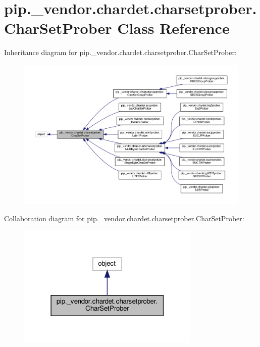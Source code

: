 \hypertarget{classpip_1_1__vendor_1_1chardet_1_1charsetprober_1_1CharSetProber}{}\section{pip.\+\_\+vendor.\+chardet.\+charsetprober.\+Char\+Set\+Prober Class Reference}
\label{classpip_1_1__vendor_1_1chardet_1_1charsetprober_1_1CharSetProber}


Inheritance diagram for pip.\+\_\+vendor.\+chardet.\+charsetprober.\+Char\+Set\+Prober\+:
\nopagebreak
\begin{figure}[H]
\begin{center}
\leavevmode
\includegraphics[width=350pt]{classpip_1_1__vendor_1_1chardet_1_1charsetprober_1_1CharSetProber__inherit__graph}
\end{center}
\end{figure}


Collaboration diagram for pip.\+\_\+vendor.\+chardet.\+charsetprober.\+Char\+Set\+Prober\+:
\nopagebreak
\begin{figure}[H]
\begin{center}
\leavevmode
\includegraphics[width=247pt]{classpip_1_1__vendor_1_1chardet_1_1charsetprober_1_1CharSetProber__coll__graph}
\end{center}
\end{figure}
